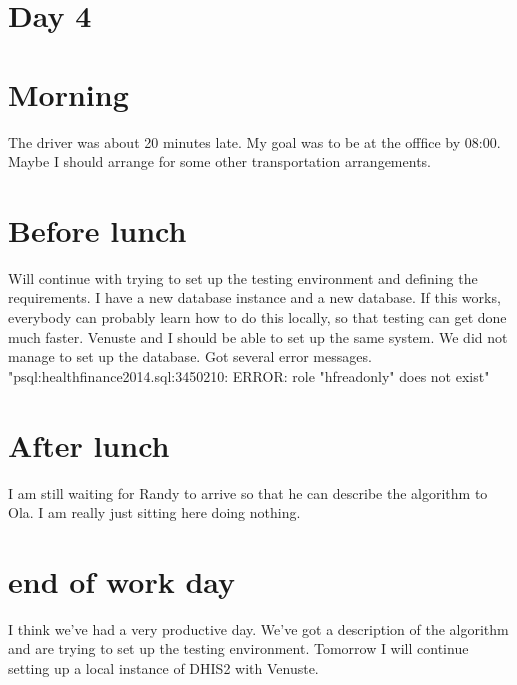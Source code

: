 \section{Day 4}
\section{Morning}
The driver was about 20 minutes late. My goal was to be at the offfice by 08:00.
Maybe I should arrange for some other transportation arrangements.

\section{Before lunch}
Will continue with trying to set up the testing environment and defining the requirements.
I have a new database instance and a new database.
If this works, everybody can probably learn how to do this locally, so that testing can get done much faster.
Venuste and I should be able to set up the same system.
We did not manage to set up the database. Got several error messages.
"psql:healthfinance2014.sql:3450210: ERROR:  role "hfreadonly" does not exist"
\section{After lunch}
I am still waiting for Randy to arrive so that he can describe the algorithm to Ola.
I am really just sitting here doing nothing. 

\section{end of work day}
I think we've had a very productive day.
We've got a description of the algorithm and are trying to set up the testing environment.
Tomorrow I will continue setting up a local instance of DHIS2 with Venuste.

